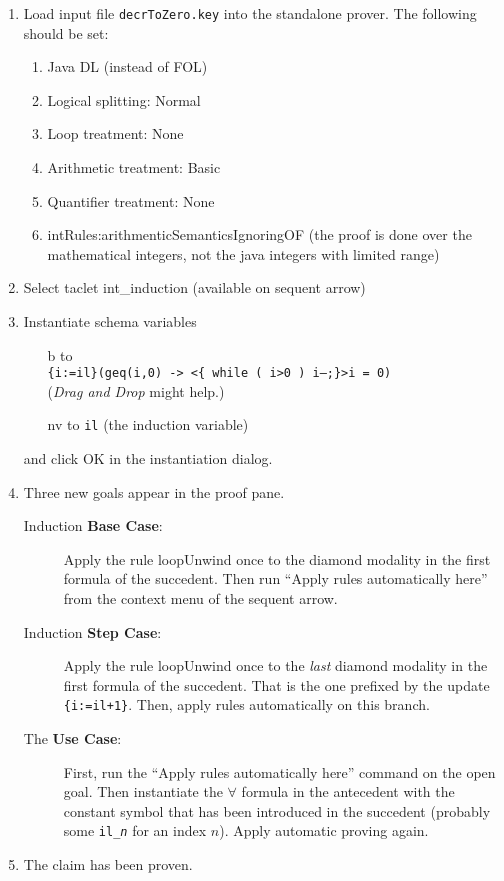 \documentclass[11pt]{article}
\begin{document}
\begin{enumerate}
\item Load input file \texttt{decrToZero.key} into the standalone
  prover. The following should be set:
  \begin{enumerate}
  \item Java DL (instead of FOL)
  \item Logical splitting: Normal
  \item Loop treatment: None
  \item Arithmetic treatment: Basic
  \item Quantifier treatment: None
  \item intRules:arithmenticSemanticsIgnoringOF (the proof is done
    over the mathematical integers, not the java integers with limited
    range)
  \end{enumerate}

\item Select taclet \textsf{int\_induction} (available on sequent
  arrow)

\item Instantiate schema variables 
  \begin{itemize} 
  \item[\textsf{b}] to \\ \texttt{\{i:=il\}(geq(i,0) -> <\{ while
      ( i>0 )  i--;\}>i = 0)}\\
    (\emph{Drag and Drop} might help.)
  \item[\textsf{nv}] to \texttt{il} (the induction variable) 
  \end{itemize}
  and click \textsf{OK} in the instantiation dialog.


\item Three new goals appear in the proof pane.

  \begin{description}
  \item[Induction \textbf{Base Case}:] Apply the rule
    \textsf{loopUnwind} once to the diamond modality in the first
    formula of the succedent. Then run ``Apply rules automatically
    here'' from the context menu of the sequent arrow.

  \item[Induction \textbf{Step Case}:] Apply the rule
    \textsf{loopUnwind} once to the \emph{last} diamond modality in
    the first formula of the succedent. That is the one prefixed by
    the update \texttt{\{i:=il+1\}}. Then, apply rules automatically on this
    branch.

  \item[The \textbf{Use Case}:] First, run the ``Apply rules
    automatically here'' command on the open goal. Then instantiate
    the $\forall$ formula in the antecedent with the constant symbol
    that has been introduced in the succedent (probably some
    \texttt{il\_{\it n}} for an index $n$). Apply automatic proving
    again.
  \end{description}

\item The claim has been proven.

\end{enumerate}
\end{document}
